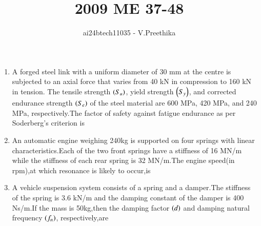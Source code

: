\documentclass[journal]{IEEEtran}
\begin{document}

\vspace{3cm}

\title{2009 ME 37-48}
\author{ai24btech11035 - V.Preethika}
\maketitle
\bigskip

\renewcommand{\thefigure}{\theenumi}
\renewcommand{\thetable}{\theenumi}
\begin{enumerate}
	\item A forged steel link with a uniform diameter of 30 mm at the centre is subjected to an axial force that varies from 40 kN in compression to 160 kN in tension. The tensile strength $\left(S_u\right)$, yield strength $\left(S_y\right)$, and corrected endurance strength $\left(S_e\right)$ of the steel material are 600 MPa, 420 MPa, and 240 MPa, respectively.The factor of safety against fatigue endurance as per Soderberg's criterion is
\begin{enumerate}
\end{enumerate}
\item An automatic engine weighing 240kg is supported on four springs with linear characteristics.Each of the two front springs have a stiffness of 16 MN/m while the stiffness of each rear spring is 32 MN/m.The engine speed(in rpm),at which resonance is likely to occur,is
\begin{enumerate}
\end{enumerate}
\item A vehicle suspension system consists of a spring and a damper.The stiffness of the spring is 3.6 kN/m and the damping constant of the damper is 400 Ns/m.If the mass is 50kg,then the damping factor $\left(d\right)$ and damping natural frequency $\left(f_n\right)$, respectively,are
\begin{enumerate}
\begin{multicols}{2}

\end{multicols}
\end{enumerate}
\end{enumerate}
\end{document}
